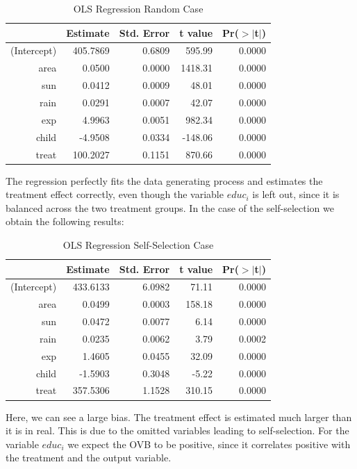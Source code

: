 \begin{enumerate}
\begin{table}[h!]
\centering
\begin{threeparttable}
\caption{OLS Regression Random Case} \label{tab:reg1}
\begin{tabular}{rrrrr}
  \hline
 & Estimate & Std. Error & t value & Pr({$>$}{$|$}t$|$) \\ 
  \hline
(Intercept) & 405.7869 & 0.6809 & 595.99 & 0.0000 \\ 
  area & 0.0500 & 0.0000 & 1418.31 & 0.0000 \\ 
  sun & 0.0412 & 0.0009 & 48.01 & 0.0000 \\ 
  rain & 0.0291 & 0.0007 & 42.07 & 0.0000 \\ 
  exp & 4.9963 & 0.0051 & 982.34 & 0.0000 \\ 
  child & -4.9508 & 0.0334 & -148.06 & 0.0000 \\ 
  treat & 100.2027 & 0.1151 & 870.66 & 0.0000 \\ 
   \hline
\end{tabular}
\end{threeparttable}
\end{table}

The regression perfectly fits the data generating process and estimates the treatment effect correctly, even though the variable $\textit{educ}_i$ is left out, since it is balanced across the two treatment groups. In the case of the self-selection we obtain the following results:

\begin{table}[h!]
\centering
\begin{threeparttable}
\caption{OLS Regression Self-Selection Case} \label{tab:reg2}
\begin{tabular}{rrrrr}
  \hline
 & Estimate & Std. Error & t value & Pr({$>$}{$|$}t$|$) \\ 
  \hline
(Intercept) & 433.6133 & 6.0982 & 71.11 & 0.0000 \\ 
  area & 0.0499 & 0.0003 & 158.18 & 0.0000 \\ 
  sun & 0.0472 & 0.0077 & 6.14 & 0.0000 \\ 
  rain & 0.0235 & 0.0062 & 3.79 & 0.0002 \\ 
  exp & 1.4605 & 0.0455 & 32.09 & 0.0000 \\ 
  child & -1.5903 & 0.3048 & -5.22 & 0.0000 \\ 
  treat & 357.5306 & 1.1528 & 310.15 & 0.0000 \\ 
   \hline
\end{tabular}
\end{threeparttable}
\end{table}

Here, we can see a large bias. The treatment effect is estimated much larger than it is in real. This is due to the omitted variables leading to self-selection. For the variable $\textit{educ}_i$ we expect the OVB to be positive, since it correlates positive with the treatment and the output variable. 



\end{enumerate}



